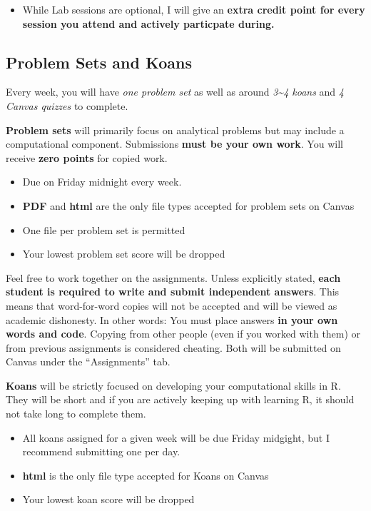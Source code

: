 \documentclass[
  letterpaper,
  DIV=11,
  numbers=noendperiod]{scrartcl}
\providecommand{\tightlist}{%
  \setlength{\itemsep}{0pt}\setlength{\parskip}{0pt}}\usepackage{longtable,booktabs,array}
\begin{document}
\begin{itemize}
\tightlist
\item
  While Lab sessions are optional, I will give an \textbf{extra credit
  point for every session you attend and actively particpate during.}
\end{itemize}

\subsection{Problem Sets and Koans}\label{problem-sets-and-koans}

Every week, you will have \emph{one problem set} as well as around
\emph{3\textasciitilde4 koans} and \emph{4 Canvas quizzes} to complete.

\textbf{Problem sets} will primarily focus on analytical problems but
may include a computational component. Submissions \textbf{must be your
own work}. You will receive \textbf{zero points} for copied work.

\begin{itemize}
\tightlist
\item
  Due on Friday midnight every week.
\item
  \textbf{PDF} and \textbf{html} are the only file types accepted for
  problem sets on Canvas
\item
  One file per problem set is permitted
\item
  Your lowest problem set score will be dropped
\end{itemize}

Feel free to work together on the assignments. Unless explicitly stated,
\textbf{each student is required to write and submit independent
answers}. This means that word-for-word copies will not be accepted and
will be viewed as academic dishonesty. In other words: You must place
answers \textbf{in your own words and code}. Copying from other people
(even if you worked with them) or from previous assignments is
considered cheating. Both will be submitted on Canvas under the
``Assignments'' tab.

\textbf{Koans} will be strictly focused on developing your computational
skills in R. They will be short and if you are actively keeping up with
learning R, it should not take long to complete them.

\begin{itemize}
\tightlist
\item
  All koans assigned for a given week will be due Friday midgight, but I
  recommend submitting one per day.
\item
  \textbf{html} is the only file type accepted for Koans on Canvas
\item
  Your lowest koan score will be dropped
\end{itemize}
\end{document}

